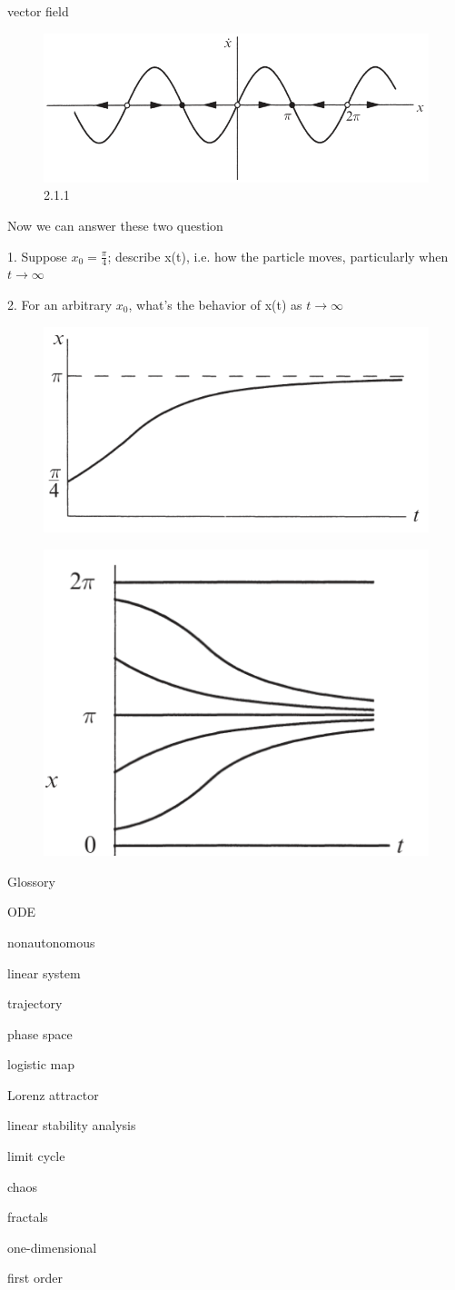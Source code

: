 \documentclass[9pt,aspectratio=43,mathserif,table]{beamer}
\begin{document}
\begin{frame}{vector field}
    
  \begin{multicols}{2}
    \begin{figure}[!h]
      \centering
      \includegraphics[width=.4\textwidth]{fig/vectorfield.png}
      \caption{2.1.1}
    \end{figure}

    Now we can answer these two question

      1. Suppose $x_0 = \frac{ \pi }{4}$; describe x(t), i.e. how the particle moves, particularly when $t \rightarrow \infty$

      2. For an arbitrary $x_0$, what's the behavior of x(t) as $t\rightarrow \infty$
    \begin{figure}[!h]
      \centering
      \includegraphics[width=.3\textwidth]{fig/solution_2.1.1.png}
    \end{figure}

       \begin{figure}[!h]
      \centering
      \includegraphics[width=.3\textwidth]{fig/solution_2.1.1_arbitraryinitial.png}
    \end{figure}
  \end{multicols}
\end{frame}

\begin{frame}{Glossory}
  \begin{multicols}{2}
   ODE

   nonautonomous

   linear system

   trajectory

   phase space

   logistic map

   Lorenz attractor

   linear stability analysis

   limit cycle 

   chaos

   fractals
   
   one-dimensional

   first order

  \end{multicols}
\end{frame}
\end{document}
